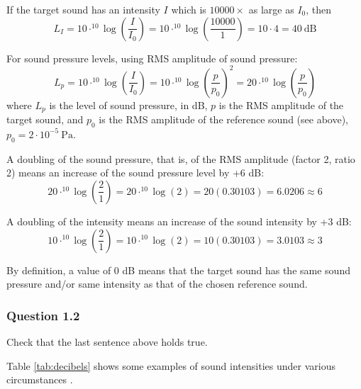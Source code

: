 \documentclass[
]{book}
\begin{document}
If the target sound has an intensity \(I\) which is \(10000\times\) as large as \(I_0\), then
\[L_I = 10 \cdot ^{10}\log \left( \frac{I}{I_0} \right) = 
10 \cdot ^{10}\log \left( \frac{10000}{1} \right) = 
10 \cdot 4 = 40\ \textrm{dB}\]

For sound pressure levels, using RMS amplitude of sound pressure:
\[  L_p = 10 \cdot ^{10}\log \left( \frac{I}{I_0} \right) 
        = 10 \cdot  ^{10}\log \left( \frac{p}{p_0} \right)^2 
        = 20 \cdot  ^{10}\log \left( \frac{p}{p_0} \right) \]
where \(L_p\) is the level of sound pressure, in dB, \(p\) is the RMS amplitude of the target sound, and \(p_0\) is the RMS amplitude of the reference sound (see above), \(p_0 = 2 \cdot 10^{-5}\ \textrm{Pa}\).

A doubling of the sound pressure, that is, of the RMS amplitude (factor 2, ratio 2) means an increase of the sound pressure level by +6 dB:
\[20\cdot ^{10}\log \left( \frac{2}{1} \right) = 20 \cdot ^{10}\log (2) =   20 (0.30103) = 6.0206 \approx 6\]

A doubling of the intensity means an increase of the sound intensity by +3 dB:
\[10\cdot ^{10}\log \left( \frac{2}{1} \right) = 10 \cdot ^{10}\log (2) =   10 (0.30103) = 3.0103 \approx 3\]

By definition, a value of 0 dB means that the target sound has the same sound pressure and/or same intensity as that of the chosen reference sound.

\protect{}\label{questions-0dB}
\subsubsection*{Question 1.2}\label{question-1.2}

Check that the last sentence above holds true.

Table \ref{tab:decibels} shows some examples of sound intensities under various circumstances \citep[p.94]{Fry_1979}.
\end{document}
